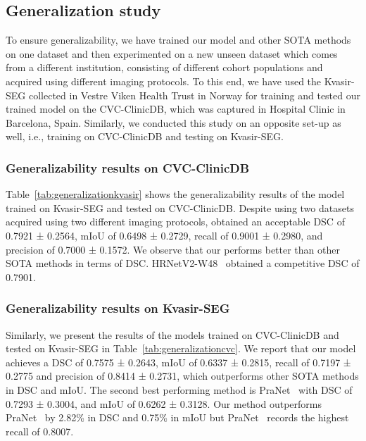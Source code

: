 \documentclass[journal,twoside,web]{IEEEtran}
\newcommand{\sysname}{\text{MSRF-Net}\xspace}
\begin{document}
\subsection{Generalization study}\label{section:general}
To ensure generalizability, we have trained our model and other \ac{SOTA} methods on one dataset and then experimented on a new unseen dataset which comes from a different institution, consisting of different cohort populations and acquired using different imaging protocols. To this end, we have used the Kvasir-SEG collected in Vestre Viken Health Trust in Norway for training and tested our trained model on the CVC-ClinicDB, which was captured in Hospital Clinic in Barcelona, Spain. Similarly, we conducted this study on an opposite set-up as well, i.e., training on CVC-ClinicDB and testing on Kvasir-SEG. 

\subsubsection{{Generalizability} results on CVC-ClinicDB}
Table~\ref{tab:generalizationkvasir} shows the generalizability results of the \sysname model trained on Kvasir-SEG and tested on CVC-ClinicDB. Despite using two datasets acquired using two different imaging protocols, \sysname obtained an acceptable \ac{DSC} of 0.7921 ± 0.2564, \ac{mIoU} of 0.6498 ± 0.2729, recall of 0.9001 ± 0.2980, and precision of 0.7000 ± 0.1572. We observe that our \sysname performs better than other \ac{SOTA} methods in terms of \ac{DSC}. HRNetV2-W48~\cite{Wang_2020} obtained a competitive \ac{DSC} of 0.7901.

\subsubsection{{Generalizability} results on  Kvasir-SEG}
Similarly, we present the results of the models trained on CVC-ClinicDB and tested on Kvasir-SEG in \mbox{Table~\ref{tab:generalizationcvc}}. We report that our model achieves a \ac{DSC} of 0.7575 ± 0.2643, \ac{mIoU} of 0.6337 ± 0.2815, recall of 0.7197 ± 0.2775 and precision of 0.8414 ± 0.2731, which outperforms other \ac{SOTA} methods in \ac{DSC} and \ac{mIoU}. The second best performing method is PraNet~\cite{fan2020pranet} with \ac{DSC} of 0.7293 ± 0.3004, and \ac{mIoU} of 0.6262 ± 0.3128. Our method outperforms PraNet~\cite{fan2020pranet} by 2.82\% in \ac{DSC} and 0.75\% in \ac{mIoU} but PraNet~\cite{fan2020pranet} records the highest recall of 0.8007.
\vspace{-0.3cm}
\end{document}
